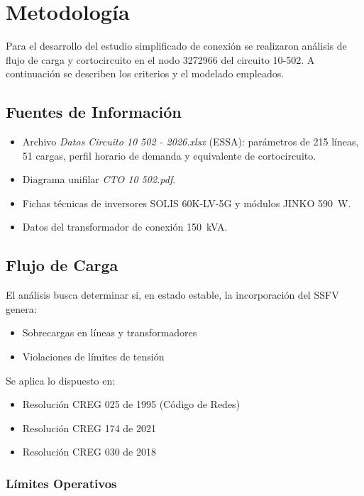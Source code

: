 \chapter{Metodología}

Para el desarrollo del estudio simplificado de conexión se realizaron análisis de flujo de carga y cortocircuito en el nodo 3272966 del circuito 10-502. A continuación se describen los criterios y el modelado empleados.

\section{Fuentes de Información}

\begin{itemize}
    \item Archivo \textit{Datos Circuito 10 502 - 2026.xlsx} (ESSA): parámetros de 215 líneas, 51 cargas, perfil horario de demanda y equivalente de cortocircuito.
    \item Diagrama unifilar \textit{CTO 10 502.pdf}.
    \item Fichas técnicas de inversores SOLIS 60K-LV-5G y módulos JINKO 590~W.
    \item Datos del transformador de conexión 150~kVA.
\end{itemize}

\section{Flujo de Carga}

El análisis busca determinar si, en estado estable, la incorporación del SSFV genera:

\begin{itemize}
    \item Sobrecargas en líneas y transformadores
    \item Violaciones de límites de tensión
\end{itemize}

Se aplica lo dispuesto en:
\begin{itemize}
    \item Resolución CREG 025 de 1995 (Código de Redes)
    \item Resolución CREG 174 de 2021
    \item Resolución CREG 030 de 2018
\end{itemize}

\subsection{Límites Operativos}

